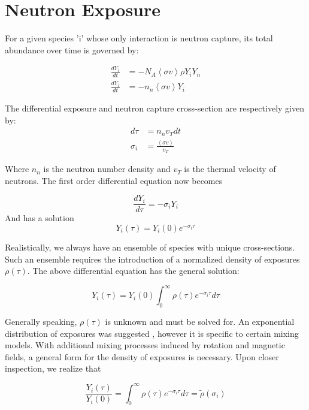 \documentclass{article}
\begin{document}
\section*{Neutron Exposure}

For a given species 'i' whose only interaction is neutron capture, its total abundance over time is governed by:

\begin{align*}
    \frac{d Y_{i}}{dt} &= -N_{A}\left<\sigma v\right>\rho Y_{i}Y_{n}\\
    \frac{d Y_{i}}{dt} &= -n_{n} \left<\sigma v\right> Y_{i}
\end{align*}

The differential exposure and neutron capture cross-section are respectively given by:
\begin{align*}
    d\tau &= n_{n}v_{T}dt\\
    \sigma_{i} &= \frac{\left<\sigma v\right>}{v_{T}}
\end{align*}

Where $n_{n}$ is the neutron number density and $v_{T}$ is the thermal velocity of neutrons. The first order differential equation 
now becomes

\begin{equation*}
    \frac{d Y_{i}}{d\tau} = -\sigma_{i}Y_{i}
\end{equation*}
And has a solution
\begin{equation*}
    Y_{i}(\tau) = Y_{i}(0)e^{-\sigma_{i}\tau}
\end{equation*}

Realistically, we always have an ensemble of species with unique cross-sections. Such an ensemble requires the introduction  of a 
normalized density of exposures $\rho(\tau)$. The above differential equation has the general solution:

\begin{equation*}
    Y_{i}(\tau) = Y_i(0)\int_{0}^{\infty}\rho(\tau)e^{-\sigma_{i}\tau}d\tau
\end{equation*}

Generally speaking, $\rho(\tau)$ is unknown and must be solved for. An exponential distribution of exposures was suggested \cite{clayton1974s}, 
however it is specific to certain mixing models. With additional mixing processes induced by rotation and magnetic fields, a 
general form for the density of exposures is necessary. Upon closer inspection, we realize that

\begin{equation*}
    \frac{Y_{i}(\tau)}{Y_i(0)} = \int_{0}^{\infty}\rho(\tau)e^{-\sigma_{i}\tau}d\tau = \tilde{\rho}(\sigma_{i})
\end{equation*}
\end{document}
